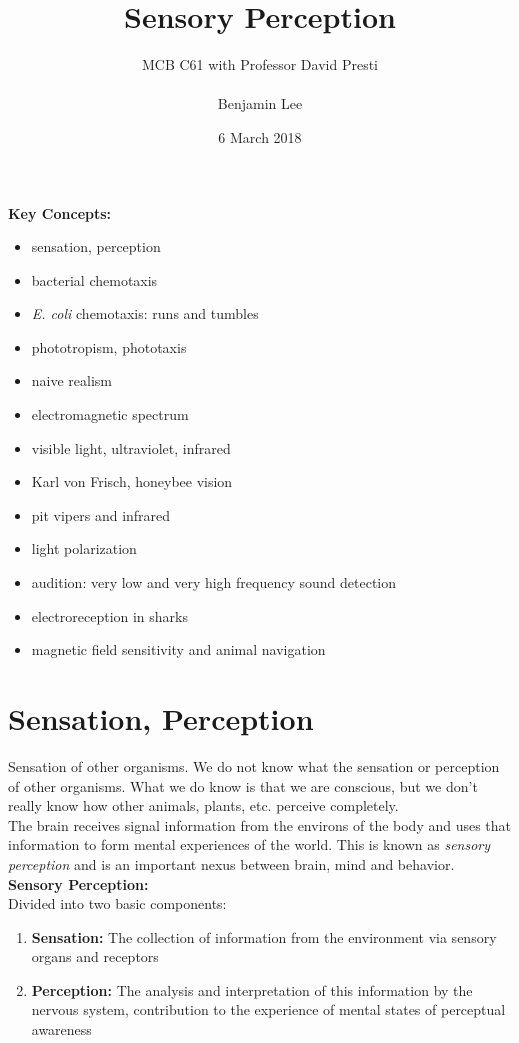 \documentclass{article}
\title{Sensory Perception}
\author{MCB C61 with Professor David Presti \\ \\ Benjamin Lee}
\date{6 March 2018}
\begin{document}
\maketitle

\textbf{Key Concepts:}
\begin{itemize}
    \item sensation, perception
    \item bacterial chemotaxis
    \item \textit{E. coli} chemotaxis: runs and tumbles
    \item phototropism, phototaxis
    \item naive realism 
    \item electromagnetic spectrum
    \item visible light, ultraviolet, infrared
    \item Karl von Frisch, honeybee vision
    \item pit vipers and infrared
    \item light polarization
    \item audition: very low and very high frequency sound detection
    \item electroreception in sharks
    \item magnetic field sensitivity and animal navigation
\end{itemize}
\newpage

\section{Sensation, Perception}
Sensation of other organisms. We do not know what the sensation or perception of other organisms. What we do know is that we are conscious, but we don't really know how other animals, plants, etc. perceive completely. \\
The brain receives signal information from the environs of the body and uses that information to form mental experiences of the world. This is known as \textit{sensory perception} and is an important nexus between brain, mind and behavior. \\
\textbf{Sensory Perception:} \\
Divided into two basic components:
\begin{enumerate}
    \item \textbf{Sensation:} The collection of information from the environment via sensory organs and receptors
    \item \textbf{Perception:} The analysis and interpretation of this information by the nervous system, contribution to the experience of mental states of perceptual awareness
\end{enumerate}
\end{document}
